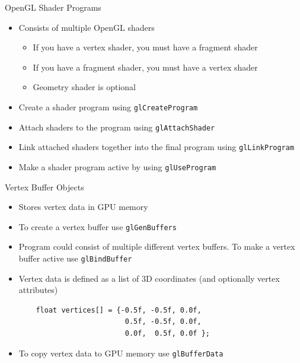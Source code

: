 \documentclass{beamer}
\begin{document}
\begin{frame}[fragile]{OpenGL Shader Programs}
    \begin{itemize}
        \item Consists of multiple OpenGL shaders
              \begin{itemize}
                  \item If you have a vertex shader, you must have a fragment shader
                  \item If you have a fragment shader, you must have a vertex shader
                  \item Geometry shader is optional
              \end{itemize}
        \item Create a shader program using {\color{blue}\verb"glCreateProgram"}
        \item Attach shaders to the program using {\color{blue}\verb"glAttachShader"}
        \item Link attached shaders together into the final program using {\color{blue}\verb"glLinkProgram"}
        \item Make a shader program active by using {\color{blue}\verb"glUseProgram"}
    \end{itemize}
\end{frame}

\begin{frame}[fragile]{Vertex Buffer Objects}
    \begin{itemize}
        \item Stores vertex data in GPU memory
        \item To create a vertex buffer use {\color{blue}\verb"glGenBuffers"}
        \item Program could consist of multiple different vertex buffers. To make a vertex buffer active use
                  {\color{blue}\verb"glBindBuffer"}
        \item Vertex data is defined as a list of 3D coordinates (and optionally vertex attributes)
              \begin{verbatim}
    float vertices[] = {-0.5f, -0.5f, 0.0f,
                         0.5f, -0.5f, 0.0f,
                         0.0f,  0.5f, 0.0f };
 \end{verbatim}
        \item To copy vertex data to GPU memory use {\color{blue}\verb"glBufferData"}
    \end{itemize}
\end{frame}
\end{document}
